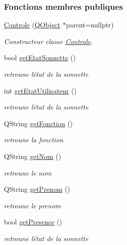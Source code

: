 \subsubsection*{Fonctions membres publiques}
\begin{DoxyCompactItemize}
\item 
\hyperlink{class_controle_af64a33acc664bf02f2ea0b4f27f781e6}{Controle} (\hyperlink{class_q_object}{Q\+Object} $\ast$parent=nullptr)
\begin{DoxyCompactList}\small\item\em Constructeur classe \hyperlink{class_controle}{Controle}. \end{DoxyCompactList}\item 
bool \hyperlink{class_controle_acabf3768430c7f1acb268ca0fa1ddf99}{get\+Etat\+Sonnette} ()
\begin{DoxyCompactList}\small\item\em retroune l\textquotesingle{}état de la sonnette \end{DoxyCompactList}\item 
int \hyperlink{class_controle_ac3bd8e8621cee56d4343e21a624e1c48}{get\+Etat\+Utilisateur} ()
\begin{DoxyCompactList}\small\item\em retroune l\textquotesingle{}état de la sonnette \end{DoxyCompactList}\item 
Q\+String \hyperlink{class_controle_a8d2891b2b01c503d10f775b4b14a3777}{get\+Fonction} ()
\begin{DoxyCompactList}\small\item\em retroune la fonction \end{DoxyCompactList}\item 
Q\+String \hyperlink{class_controle_ac6e8590a5108e97fce3ce3aa43feb881}{get\+Nom} ()
\begin{DoxyCompactList}\small\item\em retroune le nom \end{DoxyCompactList}\item 
Q\+String \hyperlink{class_controle_a0164fd9066b1703498576095ab5642c5}{get\+Prenom} ()
\begin{DoxyCompactList}\small\item\em retroune le prenom \end{DoxyCompactList}\item 
bool \hyperlink{class_controle_abf7c9fefec4980b90c9f759d48fd17aa}{get\+Presence} ()
\begin{DoxyCompactList}\small\item\em retroune l\textquotesingle{}état de la sonnette \end{DoxyCompactList}\item 

\end{DoxyCompactItemize}
